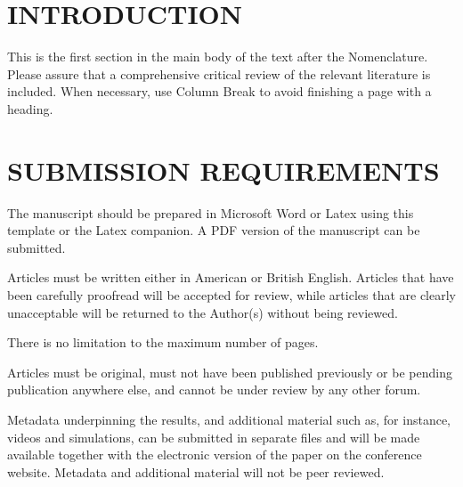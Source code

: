 \documentclass[A4paper,11pt]{marine_2023_Paper}
\begin{document}
\section{INTRODUCTION}

This is the first section in the main body of the text after the Nomenclature. Please assure that a comprehensive critical review of the relevant literature is included. When necessary, use Column Break to avoid finishing a page with a heading.

\section{SUBMISSION REQUIREMENTS}

The manuscript should be prepared in Microsoft Word or Latex using this template or the Latex companion. A PDF version of the manuscript can be submitted.

Articles must be written either in American or British English. Articles that have been carefully proofread will be accepted for review, while articles that are clearly unacceptable will be returned to the Author(s) without being reviewed.

There is no limitation to the maximum number of pages.

Articles must be original, must not have been published previously or be pending publication anywhere else, and cannot be under review by any other forum.

Metadata underpinning the results, and additional material such as, for instance, videos and simulations, can be submitted in separate files and will be made available together with the electronic version of the paper on the conference website. Metadata and additional material will not be peer reviewed.
\end{document}
